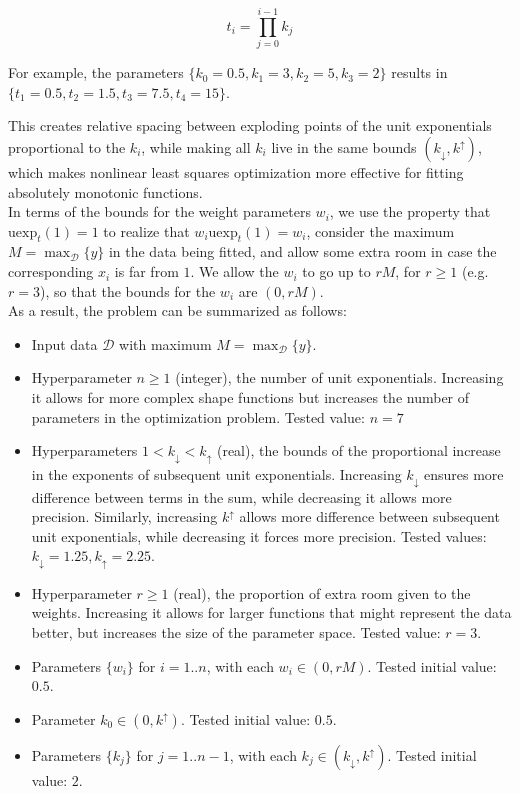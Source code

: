 \documentclass[12pt,a4paper]{article}
\newcommand{\uexp}[1] {{\text{uexp}_{#1}}}
\begin{document}
\begin{equation}
t_i = \prod_{j=0}^{i-1} k_j
\end{equation}

For example, the parameters $\{k_0 = 0.5, k_1 = 3, k_2 = 5, k_3 = 2\}$ results in $\{t_1 = 0.5, t_2 = 1.5, t_3 = 7.5, t_4 = 15\}$.

This creates relative spacing between exploding points of the unit exponentials proportional to the $k_i$, while making all $k_i$ live in the same bounds $(k_{\downarrow},k^{\uparrow})$, which makes nonlinear least squares optimization more effective for fitting absolutely monotonic functions.\\

In terms of the bounds for the weight parameters $w_i$, we use the property that $\uexp{t}(1) = 1$ to realize that $w_i \uexp{t}(1) = w_i$, consider the maximum $M = \max_{\mathcal{D}} \{y\}$ in the data being fitted, and allow some extra room in case the corresponding $x_i$ is far from $1$. We allow the $w_i$ to go up to $rM$, for $r \geq 1$ (e.g. $r = 3$), so that the bounds for the $w_i$ are $(0,rM)$.\\

As a result, the problem can be summarized as follows:

\begin{itemize}

\item Input data $\mathcal{D}$ with maximum $M = \max_{\mathcal{D}} \{y\}$.
\item Hyperparameter $n \geq 1$ (integer), the number of unit exponentials. Increasing it allows for more complex shape functions but increases the number of parameters in the optimization problem. Tested value: $n = 7$
\item Hyperparameters $1 < k_{\downarrow} < k_{\uparrow}$ (real), the bounds of the proportional increase in the exponents of subsequent unit exponentials. Increasing $k_{\downarrow}$ ensures more difference between terms in the sum, while decreasing it allows more precision. Similarly, increasing $k^{\uparrow}$ allows more difference between subsequent unit exponentials, while decreasing it forces more precision. Tested values: $k_{\downarrow} = 1.25, k_{\uparrow} = 2.25$.
\item Hyperparameter $r \geq 1$ (real), the proportion of extra room given to the weights. Increasing it allows for larger functions that might represent the data better, but increases the size of the parameter space. Tested value: $r = 3$.
\item Parameters $\{w_i\}$ for $i = 1..n$, with each $w_i \in (0,rM)$. Tested initial value: $0.5$.
\item Parameter $k_0 \in (0,k^{\uparrow})$. Tested initial value: $0.5$.
\item Parameters $\{k_j\}$ for $j = 1..n-1$, with each $k_j \in (k_{\downarrow},k^{\uparrow})$. Tested initial value: $2$.

\end{itemize}
\end{document}
